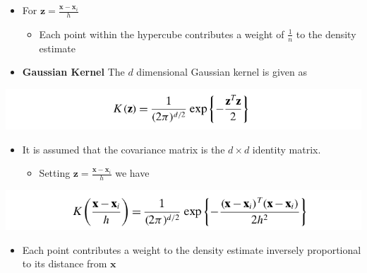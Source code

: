 \documentclass[11pt]{article}
\begin{document}
\begin{itemize}
\item For \(\pmb z = \frac{\pmb x - \pmb x_i}h\)
\begin{itemize}
\item Each point within the hypercube contributes a weight of \(\frac1n\) to the density estimate
\end{itemize}

\item \textbf{Gaussian Kernel} The \(d\) dimensional Gaussian kernel is given as
\end{itemize}
\begin{center}
\includegraphics[width=.9\linewidth]{Density-based Clustering/screenshot_2018-12-01_12-50-56.png}
\end{center}
\begin{itemize}
\item It is assumed that the covariance matrix is the \(d \times d\) identity matrix.
\begin{itemize}
\item Setting \(\pmb z = \frac{\pmb x- \pmb x_i}h\) we have
\end{itemize}
\end{itemize}
\begin{center}
\includegraphics[width=.9\linewidth]{Density-based Clustering/screenshot_2018-12-01_12-53-05.png}
\end{center}
\begin{itemize}
\item Each point contributes a weight to the density estimate inversely proportional to its distance from \(\pmb x\)
\end{itemize}
\end{document}
